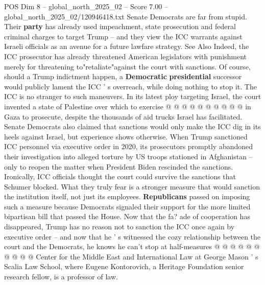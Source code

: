 \begin{textsample}{POS Dim 8 – global\_north\_2025\_02 – Score 7.00 – global\_north\_2025\_02/120946418.txt}
Senate Democrats are far from stupid.
Their \textbf{party} has already used impeachment, state prosecution and federal criminal charges to target Trump -- and they view the ICC warrants against Israeli officials as an avenue for a future lawfare strategy.
See Also Indeed, the ICC prosecutor has already threatened American legislators with punishment merely for threatening to"retaliate"against the court with sanctions.
Of course, should a Trump indictment happen, a \textbf{Democratic} \textbf{presidential} successor would publicly lament the ICC ' s overreach, while doing nothing to stop it.
The ICC is no stranger to such maneuvers.
In its latest ploy targeting Israel, the court invented a state of Palestine over which to exercise @ @ @ @ @ @ @ @ @ @ in Gaza to prosecute, despite the thousands of aid trucks Israel has facilitated.
Senate Democrats also claimed that sanctions would only make the ICC dig in its heels against Israel, but experience shows otherwise.
When Trump sanctioned ICC personnel via executive order in 2020, its prosecutors promptly abandoned their investigation into alleged torture by US troops stationed in Afghanistan -- only to reopen the matter when President Biden rescinded the sanctions.
Ironically, ICC officials thought the court could survive the sanctions that Schumer blocked.
What they truly fear is a stronger measure that would sanction the institution itself, not just its employees. \textbf{Republicans} passed on imposing such a measure because Democrats signaled their support for the more limited bipartisan bill that passed the House.
Now that the fa? ade of cooperation has disappeared, Trump has no reason not to sanction the ICC once again by executive order -- and now that he ' s witnessed the cozy relationship between the court and the Democrats, he knows he can't stop at half-measures @ @ @ @ @ @ @ @ @ @ Center for the Middle East and International Law at George Mason ' s Scalia Law School, where Eugene Kontorovich, a Heritage Foundation senior research fellow, is a professor of law.

\end{textsample}
